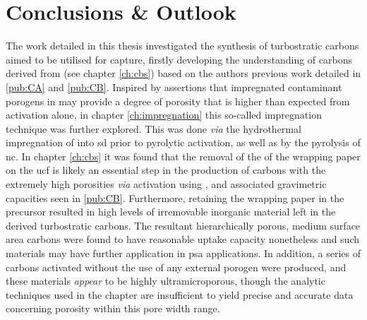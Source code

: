 \chapter{Conclusions \& Outlook}
\label{ch:conclusion}
The work detailed in this thesis investigated the synthesis of turbostratic carbons aimed to be utilised for  capture, firstly developing the understanding of carbons derived from  (see chapter \ref{ch:cbs}) based on the authors previous work detailed in \ref{pub:CA} and \ref{pub:CB}. Inspired by assertions that impregnated contaminant \glspl{porogen} in  may provide a degree of porosity that is higher than expected from  activation alone, in chapter \ref{ch:impregnation} this so-called impregnation technique was further explored. This was done \textit{via} the hydrothermal impregnation of  into \acrfull{sd} prior to pyrolytic \gls{activation}, as well as by the pyrolysis of \acrfull{nc}. In chapter \ref{ch:cbs} it was found that the removal of the of the wrapping paper on the \acrfull{ucf} is likely an essential step in the production of carbons with the extremely high porosities \textit{via} activation using , and associated gravimetric  capacities seen in \ref{pub:CB}. Furthermore, retaining the wrapping paper in the precursor resulted in high levels of irremovable inorganic material left in the derived \glspl{turbostratic carbon}. The resultant hierarchically porous, medium surface area carbons were found to have reasonable  uptake capacity nonetheless and such materials may have further application in \acrfull{psa} applications. In addition, a series of carbons activated without the use of any external \gls{porogen} were produced, and these materials \textit{appear} to be highly ultramicroporous, though the analytic techniques used in the chapter are insufficient to yield precise and accurate data concerning porosity within this pore width range. 

